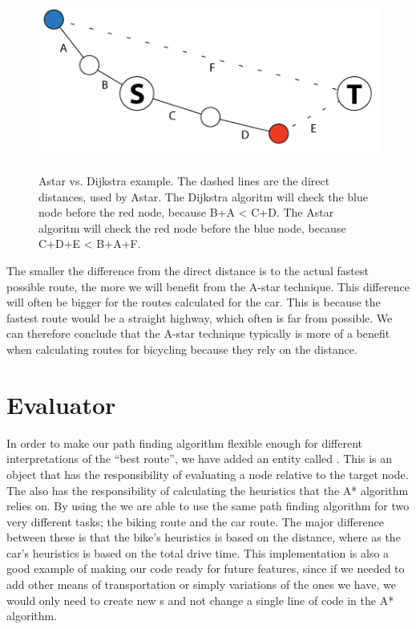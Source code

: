 \begin{figure}[!ht]
\centering
\includegraphics[width=1\linewidth]{images/AstarVSDijkstra.png}
\label{}
\caption{Astar vs. Dijkstra example. The dashed lines are the direct distances,
used by Astar. The Dijkstra algoritm will check the blue node before the red
node, because B+A < C+D. The Astar algoritm will check the red node before the
blue node, because C+D+E < B+A+F.}
\end{figure}

The smaller the difference from the direct distance is to the actual fastest
possible route, the more we will benefit from the A-star technique. This
difference will often be bigger for the routes calculated for the car. This is
because the fastest route would be a straight highway, which often is far from
possible. We can therefore conclude that the A-star technique typically is more
of a benefit when calculating routes for bicycling because they rely on the
distance.

\section{Evaluator}
\label{IMPL-EVA}
In order to make our path finding algorithm flexible enough for different 
interpretations of the ``best route'', we have added an entity called . 
This is an object that has the responsibility of evaluating a node relative to 
the target node. The  also has the responsibility of calculating the 
heuristics that the A* algorithm relies on. By using the  we are able to 
use the same path finding algorithm for two very different tasks; the biking route and 
the car route. The major difference between these is that the bike's heuristics is based 
on the distance, where as the car's heuristics is based on the total drive time. This 
implementation is also a good example of making our code ready for future features, 
since if we needed to add other means of transportation or simply variations of the ones 
we have, we would only need to create new s and not change 
a single line of code in the A* algorithm.

